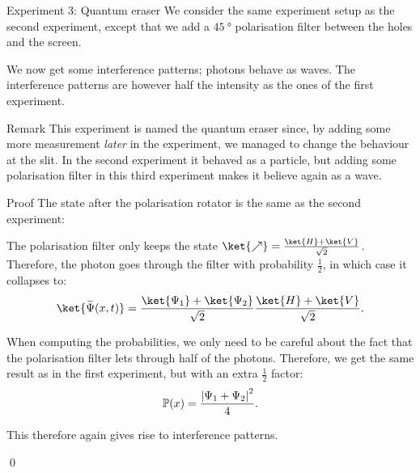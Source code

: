 \documentclass[a4paper]{article}
\begin{document}
\begin{parag}{Experiment 3: Quantum eraser}
    We consider the same experiment setup as the second experiment, except that we add a $\SI{45}{\degree}$ polarisation filter between the holes and the screen. 

    We now get some interference patterns; photons behave as waves. The interference patterns are however half the intensity as the ones of the first experiment.


    \begin{subparag}{Remark}
        This experiment is named the quantum eraser since, by adding some more measurement \emph{later} in the experiment, we managed to change the behaviour at the slit. In the second experiment it behaved as a particle, but adding some polarisation filter in this third experiment makes it believe again as a wave.
    \end{subparag}

    \begin{subparag}{Proof}
        The state after the polarisation rotator is the same as the second experiment: 
        
        The polarisation filter only keeps the state $\ket{\nearrow} = \frac{\ket{H} + \ket{V}}{\sqrt{2}}$. Therefore, the photon goes through the filter with probability $\frac{1}{2}$, in which case it collapses to:
        \[\ket{\widetilde{\Psi}\left(x, t\right)} = \frac{\ket{\Psi_1} + \ket{\Psi_2}}{\sqrt{2}} \frac{\ket{H} + \ket{V}}{\sqrt{2}}.\]

        When computing the probabilities, we only need to be careful about the fact that the polarisation filter lets through half of the photons. Therefore, we get the same result as in the first experiment, but with an extra $\frac{1}{2}$ factor: 
        \[\prob\left(x\right) = \frac{\left|\Psi_1 + \Psi_2\right|^2}{4}.\]

        This therefore again gives rise to interference patterns.

        \qed
    \end{subparag}
\end{parag}
\end{document}
